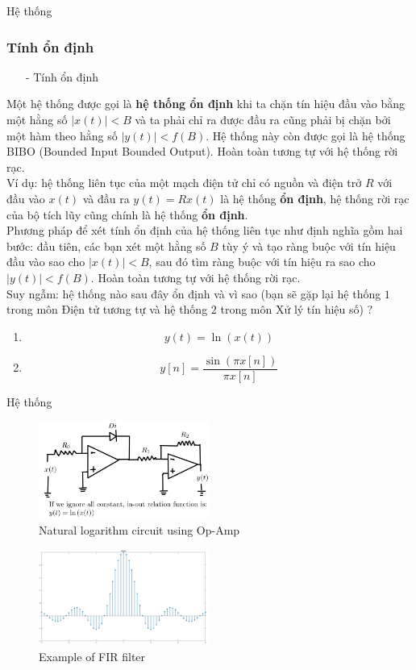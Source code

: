 \documentclass[8pt]{beamer}
\begin{document}
\begin{frame}{Hệ thống}
\subsubsection{Tính ổn định}
\begin{itemize}
	\item[-] Tính ổn định
\end{itemize}
Một hệ thống được gọi là \textbf{hệ thống ổn định} khi ta chặn tín hiệu đầu vào bằng một hằng số $|x(t)|<B$ và ta phải chỉ ra được đầu ra cũng phải\alert{ bị chặn} bởi một hàm theo hằng số $|y(t)|<f(B)$. Hệ thống này còn được gọi là \alert{hệ thống BIBO (Bounded Input Bounded Output)}. Hoàn toàn tương tự với hệ thống rời rạc.
\\ Ví dụ: hệ thống liên tục của một mạch điện tử chỉ có nguồn và điện trở $R$ với đầu vào $x(t)$ và đầu ra $y(t)=Rx(t)$ là hệ thống \textbf{ổn định}, hệ thống rời rạc của bộ tích lũy cũng chính là hệ thống \textbf{ổn định}.
\\ Phương pháp để xét tính ổn định của hệ thống liên tục như định nghĩa gồm hai bước: đầu tiên, các bạn xét một hằng số $B$ tùy ý và tạo ràng buộc với tín hiệu đầu vào sao cho $|x(t)|<B$, sau đó tìm ràng buộc với tín hiệu ra sao cho $|y(t)|<f(B)$. Hoàn toàn tương tự với hệ thống rời rạc.
\\ Suy ngẫm: hệ thống nào sau đây ổn định và vì sao (bạn sẽ gặp lại hệ thống $1$ trong môn Điện tử tương tự và hệ thống $2$ trong môn Xử lý tín hiệu số) ?
\begin{enumerate}
	\item $$y(t)=\ln{(x(t))}$$
	\item $$y[n]=\frac{\sin{(\pi x[n])}}{\pi x[n]}$$
\end{enumerate}
\end{frame}
\begin{frame}{Hệ thống}
\begin{figure}[h]
			\includegraphics[width=0.5\textwidth]{loga.jpg}
			\caption{Natural logarithm circuit using Op-Amp}	\label{fig:re16}
		\end{figure}

\begin{figure}[h]
			\includegraphics[width=0.5\textwidth]{fir.jpg}
			\caption{Example of FIR filter}	\label{fig:re17}
		\end{figure}
\end{frame}
\end{document}
